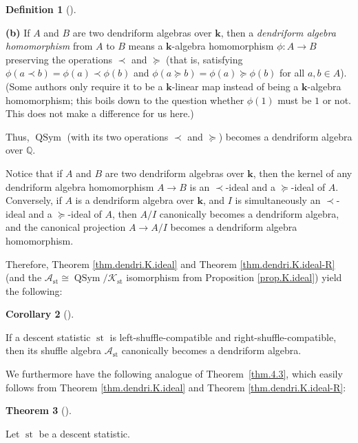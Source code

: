 \documentclass[numbers=enddot,12pt,final,onecolumn,notitlepage]{scrartcl}%
\theoremstyle{definition}
\newtheorem{theo}{Theorem}[section]
\newenvironment{theorem}[1][]
{\begin{theo}[#1]\begin{leftbar}}
{\end{leftbar}\end{theo}}
\newtheorem{defi}[theo]{Definition}
\newenvironment{definition}[1][]
{\begin{defi}[#1]\begin{leftbar}}
{\end{leftbar}\end{defi}}
\newtheorem{coro}[theo]{Corollary}
\newenvironment{corollary}[1][]
{\begin{coro}[#1]\begin{leftbar}}
{\end{leftbar}\end{coro}}
\newenvironment{verlong}{}{}
\begin{document}
\begin{verlong}
\begin{definition}
\textbf{(b)} If $A$ and $B$ are two dendriform algebras over $\mathbf{k}$,
then a \textit{dendriform algebra homomorphism} from $A$ to $B$ means a
$\mathbf{k}$-algebra homomorphism $\phi:A\rightarrow B$ preserving the
operations $\left.  \prec\right.  $ and $\left.  \succeq\right.  $ (that is,
satisfying $\phi\left(  a\left.  \prec\right.  b\right)  =\phi\left(
a\right)  \left.  \prec\right.  \phi\left(  b\right)  $ and $\phi\left(
a\left.  \succeq\right.  b\right)  =\phi\left(  a\right)  \left.
\succeq\right.  \phi\left(  b\right)  $ for all $a,b\in A$). (Some authors
only require it to be a $\mathbf{k}$-linear map instead of being a
$\mathbf{k}$-algebra homomorphism; this boils down to the question whether
$\phi\left(  1\right)  $ must be $1$ or not. This does not make a difference
for us here.)
\end{definition}

Thus, $\operatorname*{QSym}$ (with its two operations $\left.  \prec\right.  $
and $\left.  \succeq\right.  $) becomes a dendriform algebra over $\mathbb{Q}$.

Notice that if $A$ and $B$ are two dendriform algebras over $\mathbf{k}$, then
the kernel of any dendriform algebra homomorphism $A\rightarrow B$ is an
$\left.  \prec\right.  $-ideal and a $\left.  \succeq\right.  $-ideal of $A$.
Conversely, if $A$ is a dendriform algebra over $\mathbf{k}$, and $I$ is
simultaneously an $\left.  \prec\right.  $-ideal and a $\left.  \succeq
\right.  $-ideal of $A$, then $A/I$ canonically becomes a dendriform algebra,
and the canonical projection $A\rightarrow A/I$ becomes a dendriform algebra homomorphism.

Therefore, Theorem \ref{thm.dendri.K.ideal} and Theorem
\ref{thm.dendri.K.ideal-R} (and the $\mathcal{A}_{\operatorname*{st}}%
\cong\operatorname*{QSym}/\mathcal{K}_{\operatorname*{st}}$ isomorphism from
Proposition \ref{prop.K.ideal}) yield the following:

\begin{corollary}
\label{cor.dendri.quotient-dendri}If a descent statistic $\operatorname*{st}$
is left-shuffle-compatible and right-shuffle-compatible, then its shuffle
algebra $\mathcal{A}_{\operatorname*{st}}$ canonically becomes a dendriform algebra.
\end{corollary}

We furthermore have the following analogue of Theorem~\ref{thm.4.3}, which
easily follows from Theorem \ref{thm.dendri.K.ideal} and Theorem
\ref{thm.dendri.K.ideal-R}:

\begin{theorem}
\label{thm.dendri.4.3}Let $\operatorname*{st}$ be a descent statistic.


\end{theorem}
\end{verlong}
\end{document}
